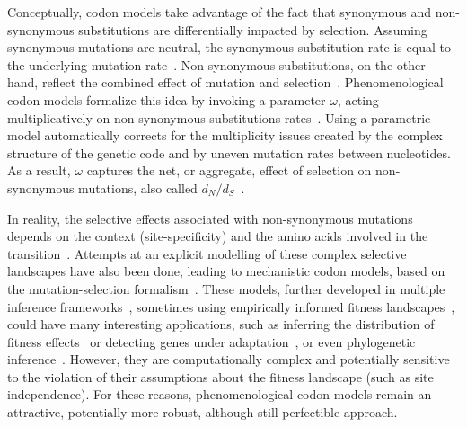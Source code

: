 \documentclass{article}
\newcommand{\dn}{d_N}
\newcommand{\ds}{d_S}
\newcommand{\dnds}{\dn / \ds}
\begin{document}
Conceptually, codon models take advantage of the fact that {synonymous} and {non-synonymous} {substitutions} are differentially impacted by selection.
Assuming {synonymous} mutations are {neutral}, the {synonymous} {substitution} rate is equal to the underlying mutation rate~\citep{kimura1983neutral}.
Non-synonymous {substitutions}, on the other hand, reflect the combined effect of mutation and selection~\citep{Ohta1995}.
Phenomenological codon models formalize this idea by invoking a parameter $\omega$, acting multiplicatively on {non-synonymous} {substitutions} rates~\citep{Muse1994, Goldman1994}.
Using a parametric model automatically corrects for the multiplicity issues created by the complex structure of the genetic code and by uneven mutation rates between nucleotides.
As a result, $\omega$ captures the net, or aggregate, effect of selection on {non-synonymous} mutations, also called $\dnds$~\citep{Spielman2015,DosReis2015}.

In reality, the selective effects associated with {non-synonymous} mutations depends on the context (site-specificity) and the amino acids involved in the transition~\citep{Kosiol2007}.
Attempts at an explicit modelling of these complex selective landscapes have also been done, leading to mechanistic codon models, based on the mutation-selection formalism~\citep{Halpern1998}.
These models, further developed in multiple inference frameworks~\citep{Rodrigue2010, Tamuri2012}, sometimes using empirically informed fitness landscapes~\citep{Bloom2014}, could have many interesting applications, such as inferring the distribution of fitness effects~\citep{Tamuri2012} or detecting genes under adaptation~\citep{Rodrigue2016, Rodrigue2021}, or even phylogenetic inference~\citep{Ren2005}.
However, they are computationally complex and potentially sensitive to the violation of their assumptions about the fitness landscape (such as site independence).
For these reasons, phenomenological codon models remain an attractive, potentially more robust, although still perfectible approach.
\end{document}
